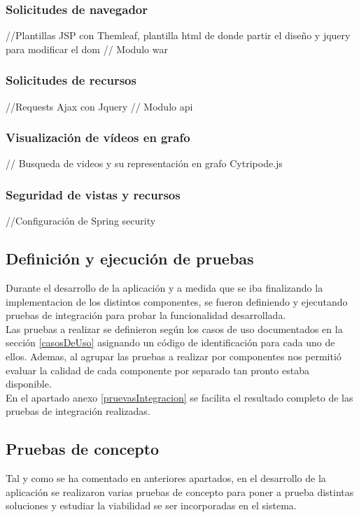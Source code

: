 \documentclass[11pt,a4paper]{article}
\begin{document}
\subsubsection{Solicitudes de navegador}
//Plantillas JSP con Themleaf, plantilla html de donde partir el diseño y jquery para modificar el dom
// Modulo war
\medskip 

\subsubsection{Solicitudes de recursos}
//Requests Ajax con Jquery
// Modulo api
\medskip 

\subsubsection{Visualización de vídeos en grafo}
// Busqueda de videos y su representación en grafo Cytripode.js
\medskip 

\subsubsection{Seguridad de vistas y recursos}
//Configuración de Spring security
\medskip 

\subsection{Definición y ejecución de pruebas}
Durante el desarrollo de la aplicación y a medida que se iba finalizando la implementacion de los distintos componentes, se fueron definiendo y ejecutando pruebas de integración para probar la funcionalidad desarrollada.
\\

Las pruebas a realizar se definieron según los casos de uso documentados en la sección \ref{casosDeUso} asignando un código de identificación para cada uno de ellos. Ademas, al agrupar las pruebas a realizar por componentes nos permitió evaluar la calidad de cada componente por separado tan pronto estaba disponible.
\\

En el apartado anexo \ref{pruevasIntegracion} se facilita el resultado completo de las pruebas de integración realizadas.
\medskip 

\subsection{Pruebas de concepto}\label{pocs}
Tal y como se ha comentado en anteriores apartados, en el desarrollo de la aplicación se realizaron varias pruebas de concepto para poner a prueba distintas soluciones y estudiar la viabilidad se ser incorporadas en el sistema.
\\
\end{document}
